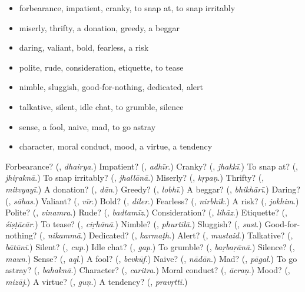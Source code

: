 \begin{itemize}
\raggedright
  \item forbearance, impatient, cranky, to snap at, to snap irritably
  \item miserly, thrifty, a donation, greedy, a beggar
  \item daring, valiant, bold, fearless, a risk
  \item polite, rude, consideration, etiquette, to tease
  \item nimble, sluggish, good-for-nothing, dedicated, alert
  \item talkative, silent, idle chat, to grumble, silence
  \item sense, a fool, naive, mad, to go astray
  \item character, moral conduct, mood, a virtue, a tendency
\end{itemize}

\begin{tcolorbox}[breakable,colback=teal!4,colframe=teal!35!black,title={Before you move on}]
Forbearance? (\textbf{}, \emph{dhairya}.) Impatient? (\textbf{}, \emph{adhīr}.) Cranky? (\textbf{}, \emph{jhakkī}.) To snap at? (\textbf{}, \emph{jhiṛaknā}.) To snap irritably? (\textbf{}, \emph{jhallānā}.) Miserly? (\textbf{}, \emph{kṛpaṇ}.) Thrifty? (\textbf{}, \emph{mitvyayī}.) A donation? (\textbf{}, \emph{dān}.) Greedy? (\textbf{}, \emph{lobhī}.) A beggar? (\textbf{}, \emph{bhikhārī}.) Daring? (\textbf{}, \emph{sāhas}.) Valiant? (\textbf{}, \emph{vīr}.) Bold? (\textbf{}, \emph{diler}.) Fearless? (\textbf{}, \emph{nirbhīk}.) A risk? (\textbf{}, \emph{jokhim}.) Polite? (\textbf{}, \emph{vinamra}.) Rude? (\textbf{}, \emph{badtamīz}.) Consideration? (\textbf{}, \emph{lihāz}.) Etiquette? (\textbf{}, \emph{śiṣṭācār}.) To tease? (\textbf{}, \emph{ciṛhānā}.) Nimble? (\textbf{}, \emph{phurtīlā}.) Sluggish? (\textbf{}, \emph{sust}.) Good-for-nothing? (\textbf{}, \emph{nikammā}.) Dedicated? (\textbf{}, \emph{karmaṭh}.) Alert? (\textbf{}, \emph{mustaid}.) Talkative? (\textbf{}, \emph{bātūnī}.) Silent? (\textbf{}, \emph{cup}.) Idle chat? (\textbf{}, \emph{gap}.) To grumble? (\textbf{}, \emph{baṛbaṛānā}.) Silence? (\textbf{}, \emph{maun}.) Sense? (\textbf{}, \emph{aql}.) A fool? (\textbf{}, \emph{bevkūf}.) Naive? (\textbf{}, \emph{nādān}.) Mad? (\textbf{}, \emph{pāgal}.) To go astray? (\textbf{}, \emph{bahaknā}.) Character? (\textbf{}, \emph{caritra}.) Moral conduct? (\textbf{}, \emph{ācraṇ}.) Mood? (\textbf{}, \emph{mizāj}.) A virtue? (\textbf{}, \emph{guṇ}.) A tendency? (\textbf{}, \emph{pravṛtti}.)
\end{tcolorbox}
